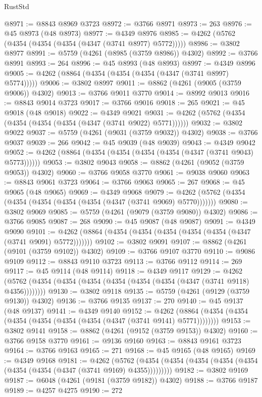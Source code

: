 \begin{lexlean}{RustStd}
\begin{coremodule}
@8971 := @8843 @8969 @3723
@8972 := @3766 @8971
@8973 := 263
@8976 := @45 @8973 (@48 @8973)
@8977 := @4349 @8976
@8985 := @4262 (@5762 (@4354 (@4354 (@4354 (@4347 (@3741 @8977) @5772)))))
@8986 := @3802 @8977
@8991 := @5759 (@4261 (@8985 (@3759 @8986)) @4302)
@8992 := @3766 @8991
@8993 := 264
@8996 := @45 @8993 (@48 @8993)
@8997 := @4349 @8996
@9005 := @4262 (@8864 (@4354 (@4354 (@4354 (@4347 (@3741 @8997) @5774)))))
@9006 := @3802 @8997
@9011 := @8862 (@4261 (@9005 (@3759 @9006)) @4302)
@9013 := @3766 @9011 @3770
@9014 := @8992 @9013
@9016 := @8843 @9014 @3723
@9017 := @3766 @9016
@9018 := 265
@9021 := @45 @9018 (@48 @9018)
@9022 := @4349 @9021
@9031 := @4262 (@5762 (@4354 (@4354 (@4354 (@4354 (@4347 (@3741 @9022) @5771))))))
@9032 := @3802 @9022
@9037 := @5759 (@4261 (@9031 (@3759 @9032)) @4302)
@9038 := @3766 @9037
@9039 := 266
@9042 := @45 @9039 (@48 @9039)
@9043 := @4349 @9042
@9052 := @4262 (@8864 (@4354 (@4354 (@4354 (@4354 (@4347 (@3741 @9043) @5773))))))
@9053 := @3802 @9043
@9058 := @8862 (@4261 (@9052 (@3759 @9053)) @4302)
@9060 := @3766 @9058 @3770
@9061 := @9038 @9060
@9063 := @8843 @9061 @3723
@9064 := @3766 @9063
@9065 := 267
@9068 := @45 @9065 (@48 @9065)
@9069 := @4349 @9068
@9079 := @4262 (@5762 (@4354 (@4354 (@4354 (@4354 (@4354 (@4347 (@3741 @9069) @5770)))))))
@9080 := @3802 @9069
@9085 := @5759 (@4261 (@9079 (@3759 @9080)) @4302)
@9086 := @3766 @9085
@9087 := 268
@9090 := @45 @9087 (@48 @9087)
@9091 := @4349 @9090
@9101 := @4262 (@8864 (@4354 (@4354 (@4354 (@4354 (@4354 (@4347 (@3741 @9091) @5772)))))))
@9102 := @3802 @9091
@9107 := @8862 (@4261 (@9101 (@3759 @9102)) @4302)
@9109 := @3766 @9107 @3770
@9110 := @9086 @9109
@9112 := @8843 @9110 @3723
@9113 := @3766 @9112
@9114 := 269
@9117 := @45 @9114 (@48 @9114)
@9118 := @4349 @9117
@9129 := @4262 (@5762 (@4354 (@4354 (@4354 (@4354 (@4354 (@4354 (@4347 (@3741 @9118) @4356))))))))
@9130 := @3802 @9118
@9135 := @5759 (@4261 (@9129 (@3759 @9130)) @4302)
@9136 := @3766 @9135
@9137 := 270
@9140 := @45 @9137 (@48 @9137)
@9141 := @4349 @9140
@9152 := @4262 (@8864 (@4354 (@4354 (@4354 (@4354 (@4354 (@4354 (@4347 (@3741 @9141) @5771))))))))
@9153 := @3802 @9141
@9158 := @8862 (@4261 (@9152 (@3759 @9153)) @4302)
@9160 := @3766 @9158 @3770
@9161 := @9136 @9160
@9163 := @8843 @9161 @3723
@9164 := @3766 @9163
@9165 := 271
@9168 := @45 @9165 (@48 @9165)
@9169 := @4349 @9168
@9181 := @4262
    (@5762 (@4354 (@4354 (@4354 (@4354 (@4354 (@4354 (@4354 (@4347 (@3741 @9169) @4355)))))))))
@9182 := @3802 @9169
@9187 := @6048 (@4261 (@9181 (@3759 @9182)) @4302)
@9188 := @3766 @9187
@9189 := @4257 @4275
@9190 := 272

\end{coremodule}
\end{lexlean}
